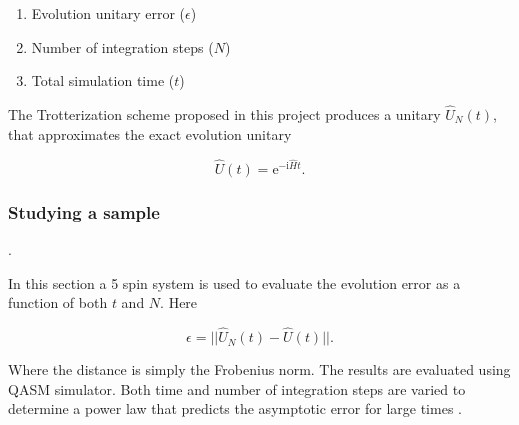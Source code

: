 \begin{enumerate}
\def\labelenumi{\arabic{enumi}.}
\tightlist
\item
  Evolution unitary error (\(\epsilon\))
\item
  Number of integration steps (\(N\))
\item
  Total simulation time (\(t\))
\end{enumerate}

The Trotterization scheme proposed in this project produces a unitary
\(\hat{U}_N(t)\), that approximates the exact evolution unitary

\[
\hat{U}(t) = \mathrm{e}^{-\mathrm{i}\hat{H}t}.
\]

    \hypertarget{studying-a-sample}{%
\subsubsection{Studying a sample}\label{studying-a-sample}}.

In this section a 5 spin system is used to evaluate the evolution error
as a function of both \(t\) and \(N\). Here

\[
\epsilon = ||\hat{U}_N(t) - \hat{U}(t)||.
\]

Where the distance is simply the Frobenius norm. The results are
evaluated using QASM simulator. Both time and number of integration
steps are varied to determine a power law that predicts the asymptotic
error for large times .

